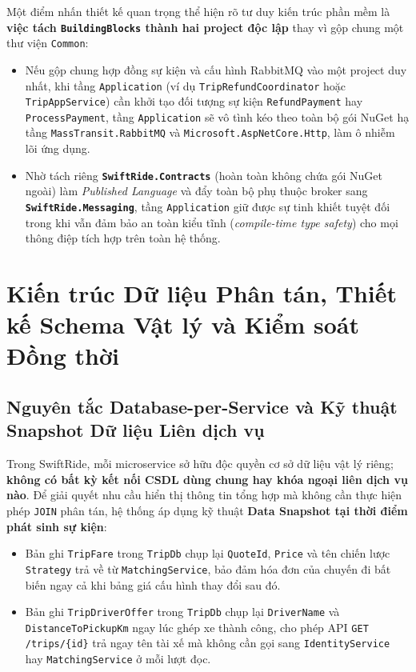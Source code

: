 \documentclass[12pt,a4paper]{article}
\begin{document}
Một điểm nhấn thiết kế quan trọng thể hiện rõ tư duy kiến trúc phần mềm là \textbf{việc tách \texttt{BuildingBlocks} thành hai project độc lập} thay vì gộp chung một thư viện \texttt{Common}:
\begin{itemize}[nosep]
    \item Nếu gộp chung hợp đồng sự kiện và cấu hình RabbitMQ vào một project duy nhất, khi tầng \texttt{Application} (ví dụ \texttt{TripRefundCoordinator} hoặc \texttt{TripAppService}) cần khởi tạo đối tượng sự kiện \texttt{RefundPayment} hay \texttt{ProcessPayment}, tầng \texttt{Application} sẽ vô tình kéo theo toàn bộ gói NuGet hạ tầng \texttt{MassTransit.RabbitMQ} và \texttt{Microsoft.AspNetCore.Http}, làm ô nhiễm lõi ứng dụng.
    \item Nhờ tách riêng \textbf{\texttt{SwiftRide.Contracts}} (hoàn toàn không chứa gói NuGet ngoài) làm \textit{Published Language} và đẩy toàn bộ phụ thuộc broker sang \textbf{\texttt{SwiftRide.Messaging}}, tầng \texttt{Application} giữ được sự tinh khiết tuyệt đối trong khi vẫn đảm bảo an toàn kiểu tĩnh (\textit{compile-time type safety}) cho mọi thông điệp tích hợp trên toàn hệ thống.
\end{itemize}

\section{Kiến trúc Dữ liệu Phân tán, Thiết kế Schema Vật lý và Kiểm soát Đồng thời}

\subsection{Nguyên tắc Database-per-Service và Kỹ thuật Snapshot Dữ liệu Liên dịch vụ}
Trong SwiftRide, mỗi microservice sở hữu độc quyền cơ sở dữ liệu vật lý riêng; \textbf{không có bất kỳ kết nối CSDL dùng chung hay khóa ngoại liên dịch vụ nào}. Để giải quyết nhu cầu hiển thị thông tin tổng hợp mà không cần thực hiện phép \texttt{JOIN} phân tán, hệ thống áp dụng kỹ thuật \textbf{Data Snapshot tại thời điểm phát sinh sự kiện}:
\begin{itemize}[nosep]
    \item Bản ghi \texttt{TripFare} trong \texttt{TripDb} chụp lại \texttt{QuoteId}, \texttt{Price} và tên chiến lược \texttt{Strategy} trả về từ \texttt{MatchingService}, bảo đảm hóa đơn của chuyến đi bất biến ngay cả khi bảng giá cấu hình thay đổi sau đó.
    \item Bản ghi \texttt{TripDriverOffer} trong \texttt{TripDb} chụp lại \texttt{DriverName} và \texttt{DistanceToPickupKm} ngay lúc ghép xe thành công, cho phép API \texttt{GET /trips/\{id\}} trả ngay tên tài xế mà không cần gọi sang \texttt{IdentityService} hay \texttt{MatchingService} ở mỗi lượt đọc.
\end{itemize}
\end{document}
